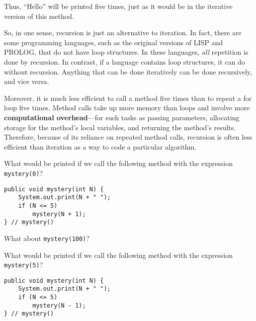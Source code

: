 \noindent Thus, ``Hello'' will be printed five times, just as
it would be in the iterative version of this method.

So, in one sense, recursion is just an alternative to iteration.  In
fact, there are some programming languages, such as the original
versions of LISP and PROLOG, that do not have loop structures.  In
these languages, {\it all} repetition is done by recursion.  In
contrast, if a language contains loop structures, it can do without
recursion.  Anything that can be done iteratively can be done
recursively, and vice versa.

Moreover, it is much less efficient to call a method five times than to
repeat a for loop five times.  Method calls take up more memory than
loops and involve more {\bf computational overhead}---for such tasks
as passing parameters, allocating storage for the method's local
variables, and returning the method's results.   Therefore, because of
its reliance on repeated method calls, recursion is often less
efficient than iteration as a way to code a particular algorithm.



\pagebreak
{}
\label{self-study-exercises}
\begin{SSTUDY}
\item  What would be printed if we call the following method with
the expression {\tt mystery(0)}? 

\begin{jjjlisting}
\begin{lstlisting}
public void mystery(int N) {
    System.out.print(N + " ");
    if (N <= 5)
        mystery(N + 1);
} // mystery()
\end{lstlisting}
\end{jjjlisting}

\noindent What about {\tt mystery(100)}?

\item  What would be printed if we call the following method with
the expression {\tt mystery(5)}?

\begin{jjjlisting}
\begin{lstlisting}
public void mystery(int N) {
    System.out.print(N + " ");
    if (N <= 5)
        mystery(N - 1);
} // mystery()
\end{lstlisting}
\end{jjjlisting}

\end{SSTUDY}


